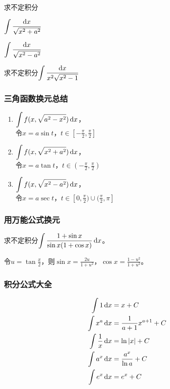 \documentclass[14pt,notheorems,leqno,xcolor={rgb}]{beamer} %
\begin{document}
\begin{frame}
\begin{example}
求不定积分
\begin{enumlite}
  \item $\Int\dfrac{\d x}{\sqrt{x^2+a^2}}$
  \item $\Int\dfrac{\d x}{\sqrt{x^2-a^2}}$
\end{enumlite}
\end{example}
\pause
\begin{exercise}
求不定积分$\Int\dfrac{\d x}{x^2\sqrt{x^2-1}}$
\end{exercise}
\end{frame}

\begin{frame}
\frametitle{三角函数换元总结}
\begin{enumerate}[<+->]
  \item $\displaystyle\int f(x,\sqrt{a^2-x^2})\mathop{}\!\mathrm{d} x$，\\\hfill
        令$x=a\sin t$，$t\in[-\frac{\pi}2,\frac{\pi}2]$
  \item $\displaystyle\int f(x,\sqrt{x^2+a^2})\mathop{}\!\mathrm{d} x$，\\\hfill
        令$x=a\tan t$，$t\in(-\frac{\pi}2,\frac{\pi}2)$
  \item $\displaystyle\int f(x,\sqrt{x^2-a^2})\mathop{}\!\mathrm{d} x$，\\\hfill
        令$x=a\sec t$，$t\in[0,\frac{\pi}2)\cup (\frac{\pi}2,\pi]$
\end{enumerate}
\end{frame}

\begin{iframe}
\frametitle{用万能公式换元}
\begin{example}
求不定积分$\Int\dfrac{1+\sin x}{\sin x(1+\cos x)} \d x$。
\end{example}
\pause
\begin{solution}
令$u=\tan\frac{x}2$，则$\sin x=\frac{2u}{1+u^2}$，$\cos x=\frac{1-u^2}{1+u^2}$。
\end{solution}
\end{iframe}

\begin{frame}[shrink=4]
\frametitle{积分公式大全}
\noindent
\begin{align}
\int 1\mathop{}\!\mathrm{d}{x} &= x+C \\
\int x^a \mathop{}\!\mathrm{d}{x} &= \frac{1}{a+1}x^{a+1}+C\\
\int \frac1x \mathop{}\!\mathrm{d}{x} &= \ln|x|+C \\
\int a^x \mathop{}\!\mathrm{d}{x} &= \frac{a^x}{\ln a} + C \\
\int e^x \mathop{}\!\mathrm{d}{x} &= e^x + C
\end{align}
\end{frame}
\end{document}
